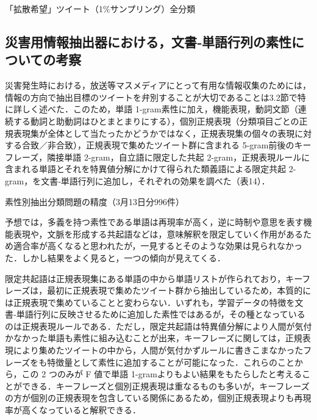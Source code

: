 \documentclass[japanese]{jnlp_1.4}
\begin{document}
\begin{table}[p]
\caption{「拡散希望」ツイート（1\%サンプリング）全分類}

\end{table}


\subsection{災害用情報抽出器における，文書‐単語行列の素性についての考察}

災害発生時における，放送等マスメディアにとって有用な情報収集のためには，情報の方向で抽出目標のツイートを弁別することが大切であることは3.2節で特に詳しく述べた．このため，単語 1-gram素性に加え，機能表現，動詞文節（連続する動詞と助動詞はひとまとまりにする），個別正規表現（分類項目ごとの正規表現集が全体として当たったかどうかではなく，正規表現集の個々の表現に対する合致／非合致），正規表現で集めたツイート群に含まれる 5-gram前後のキーフレーズ，隣接単語 2-gram，自立語に限定した共起 2-gram，正規表現ルールに含まれる単語とそれを特異値分解にかけて得られた類義語による限定共起 2-gram，を文書‐単語行列に追加し，それぞれの効果を調べた（表14）．

\begin{table}[t]
\caption{素性別抽出分類問題の精度（3月13日分996件）}

\end{table}

予想では，多義を持つ素性である単語は再現率が高く，逆に時制や意思を表す機能表現や，文脈を形成する共起語などは，意味解釈を限定していく作用があるため適合率が高くなると思われたが，一見するとそのような効果は見られなかった．しかし結果をよく見ると，一つの傾向が見えてくる．

限定共起語は正規表現集にある単語の中から単語リストが作られており，キーフレーズは，最初に正規表現で集めたツイート群から抽出しているため，本質的には正規表現で集めていることと変わらない．いずれも，学習データの特徴を文書‐単語行列に反映させるために追加した素性ではあるが，その種となっているのは正規表現ルールである．ただし，限定共起語は特異値分解により人間が気付かなかった単語も素性に組み込むことが出来，キーフレーズに関しては，正規表現により集めたツイートの中から，人間が気付かずルールに書きこまなかったフレーズをも特徴量として素性に追加することが可能になった．これらのことから，この 2 つのみが F 値で単語 1-gramよりもよい結果をもたらしたと考えることができる．キーフレーズと個別正規表現は重なるものも多いが，キーフレーズの方が個別の正規表現を包含している関係にあるため，個別正規表現よりも再現率が高くなっていると解釈できる．
\end{document}
